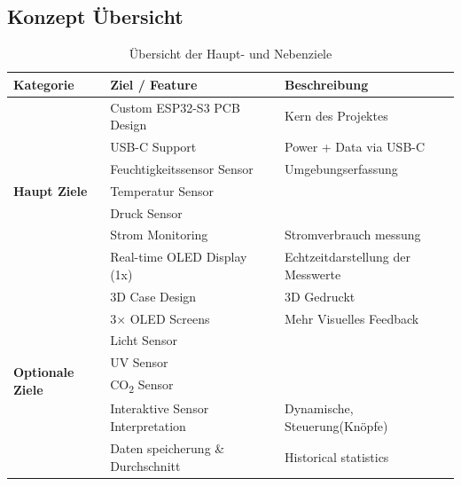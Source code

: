 \subsection{Konzept Übersicht}
\begin{table}[h!]
\centering
\renewcommand{\arraystretch}{1.3}
\begin{tabularx}{\textwidth}{|l|X|X|}
\hline
\textbf{Kategorie} & \textbf{Ziel / Feature} & \textbf{Beschreibung} \\
\hline
\multirow{7}{*}{\textbf{Haupt Ziele}} 
    & Custom ESP32-S3 PCB Design      & Kern des Projektes \\
    & USB-C Support                   & Power + Data via USB-C \\
    & Feuchtigkeitssensor Sensor                 & Umgebungserfassung \\
    & Temperatur Sensor              & \\
    & Druck Sensor                 & \\
    & Strom Monitoring              & Stromverbrauch messung \\
    & Real-time OLED Display (1x)     & Echtzeitdarstellung der Messwerte \\
\hline
\multirow{7}{*}{\textbf{Optionale Ziele}}
    & 3D Case Design                  & 3D Gedruckt \\
    & 3× OLED Screens                 & Mehr Visuelles Feedback \\
    & Licht  Sensor                    & \\
    & UV Sensor                       & \\
    & CO\textsubscript{2} Sensor      & \\
    & Interaktive Sensor Interpretation & Dynamische, Steuerung(Knöpfe) \\
    & Daten speicherung \& Durchschnitt  & Historical statistics \\
\hline
\end{tabularx}
\caption{Übersicht der Haupt- und Nebenziele}
\end{table}
\newpage
